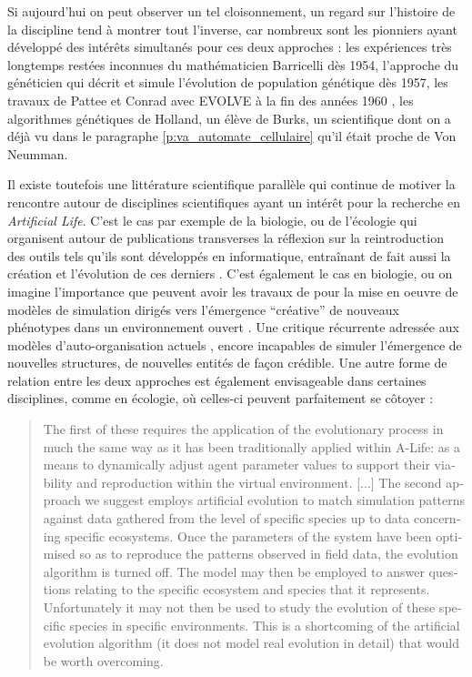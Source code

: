 Si aujourd'hui on peut observer un tel cloisonnement, un regard sur l'histoire de la discipline tend à montrer tout l'inverse, car nombreux sont les pionniers ayant développé des intérêts simultanés pour ces deux approches : les expériences très longtemps restées inconnues du mathématicien Barricelli dès 1954, l'approche du généticien \textcite{Fraser1957} qui décrit et simule l'évolution de population génétique dès 1957, les travaux de Pattee et Conrad avec EVOLVE à la fin des années 1960 \autocite{Conrad1970}, les algorithmes génétiques de Holland, un élève de Burks, un scientifique dont on a déjà vu dans le paragraphe \ref{p:va_automate_cellulaire} qu'il était proche de Von Neumman.

Il existe toutefois une littérature scientifique parallèle qui continue de motiver la rencontre autour de disciplines scientifiques ayant un intérêt pour la recherche en \textit{Artificial Life}. C'est le cas par exemple de la biologie, ou de l'écologie \autocite{Hamblin2013} qui organisent autour de publications transverses la réflexion sur la reintroduction des outils tels qu'ils sont développés en informatique, entraînant de fait aussi la création et l'évolution de ces derniers \autocite{Hogeweg2011}. C'est également le cas en biologie, ou on imagine l'importance que peuvent avoir les travaux de \textcites{Taylor2001}[221]{Taylor1999} pour la mise en oeuvre de modèles de simulation dirigés vers l'émergence \enquote{créative} de nouveaux phénotypes dans un environnement ouvert \autocite[33]{Taylor1999}. Une critique récurrente adressée aux modèles d'auto-organisation actuels \autocite{Pumain2003}, encore incapables de simuler l'émergence de nouvelles structures, de nouvelles entités de façon crédible. Une autre forme de relation entre les deux approches est également envisageable dans certaines disciplines, comme en écologie, où celles-ci peuvent parfaitement se côtoyer :
\foreignblockquote{english}[\cite{Dorin2008}]{The first of these requires the application of the evolutionary process in much the same way as it has been traditionally applied within A-Life: as a means to dynamically adjust agent parameter values to support their viability and reproduction within the virtual environment. [...] The second approach we suggest employs artificial evolution to match simulation patterns against data gathered from the level of specific species up to data concerning specific ecosystems. Once the parameters of the system have been optimised so as to reproduce the patterns observed in field data, the evolution algorithm is turned off. The model may then be employed to answer questions relating to the specific ecosystem and species that it represents. Unfortunately it may not then be used to study the evolution of these specific species in specific environments. This is a shortcoming of the artificial evolution algorithm (it does not model real evolution in detail) that would be worth overcoming.}

